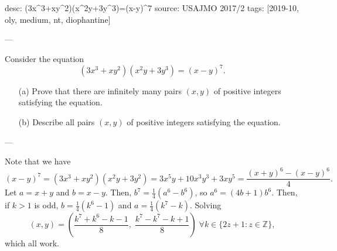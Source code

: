 desc: (3x^3+xy^2)(x^2y+3y^3)=(x-y)^7
source: USAJMO 2017/2
tags: [2019-10, oly, medium, nt, diophantine]

---

Consider the equation \[(3x^3+xy^2)(x^2y+3y^3)=(x-y)^7.\]
\begin{enumerate}[itemsep=0em]
    \item[(a)] Prove that there are infinitely many pairs $(x,y)$ of positive integers satisfying the equation.
    \item[(b)] Describe all pairs $(x,y)$ of positive integers satisfying the equation.
\end{enumerate}

---

Note that we have \[(x-y)^7=(3x^3+xy^2)(x^2y+3y^2)=3x^5y+10x^3y^3+3xy^5=\frac{(x+y)^6-(x-y)^6}4.\]
Let $a=x+y$ and $b=x-y$. Then, $b^7=\tfrac14(a^6-b^6)$, so $a^6=(4b+1)b^6$. Then, if $k>1$ is odd, $b=\tfrac14(k^6-1)$ and $a=\tfrac14(k^7-k)$. Solving \[\boxed{(x,y)=\left(\frac{k^7+k^6-k-1}8,\;\frac{k^7-k^7-k+1}8\right)\;\forall k\in\{2z+1:z\in\mathbb Z\}},\]
which all work.
